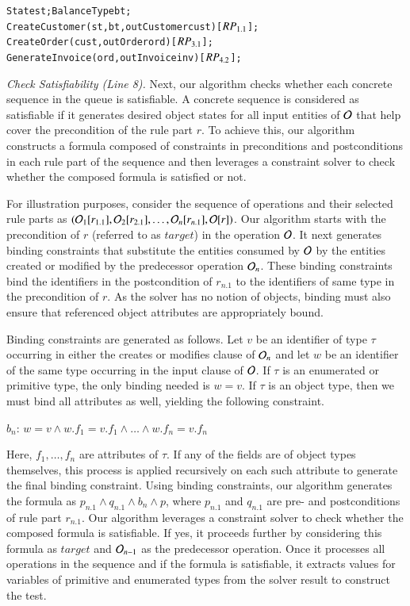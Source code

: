 \vspace*{-5pt}
{\small
\begin{alltt}
  State st; BalanceType bt;
  CreateCustomer(st, bt, out Customer cust) [\(RP\sb{1.1}\)];
  CreateOrder(cust, out Order ord) [\(RP\sb{3.1}\)];	
  GenerateInvoice(ord, out Invoice inv) [\(RP\sb{4.2}\)];  
\end{alltt}
}
\vspace*{-5pt}

\textit{Check Satisfiability (Line 8).} Next, our algorithm checks whether 
each concrete sequence in the queue is satisfiable. A concrete sequence 
is considered as satisfiable if it generates desired
object states for all input entities of ${\cal O}$ that help cover the precondition of the rule
part $r$. To achieve this, our algorithm constructs a formula composed
of constraints in preconditions and postconditions in each rule part of the sequence
and then leverages a constraint solver to check whether the composed
formula is satisfied or not.

For illustration purposes, consider the sequence of operations and their selected
rule parts as $({\cal O}_1 [r_{1.1}], {\cal O}_2 [r_{2.1}], \ldots, {\cal O}_n [r_{n.1}], {\cal O} [r])$.
Our algorithm starts with the precondition of $r$ (referred to as $target$) in the operation ${\cal O}$. 
It next generates binding constraints that substitute the entities
consumed by ${\cal O}$ by the entities created or
modified by the predecessor operation ${\cal O}_n$. These binding constraints bind 
the identifiers in the postcondition of $r_{n.1}$ to the identifiers of same type
in the precondition of $r$. As the solver has no
notion of objects, binding must also ensure that referenced object attributes
are appropriately bound.

Binding constraints are generated as follows. Let $v$ be an
identifier of type $\tau$ occurring in either the creates or modifies
clause of ${\cal O}_n$ and let $w$ be an identifier of the same type
occurring in the input clause of ${\cal O}$. If $\tau$ is an enumerated or primitive type,
the only binding needed is $w = v$. If $\tau$ is an object type, then
we must bind all attributes as well, yielding the following constraint.

$b_n$: $w = v \wedge w.f_1 = v.f_1 \wedge \ldots \wedge w.f_n = v.f_n$ 

Here, $f_1, \ldots , f_n$ are attributes of $\tau$. If any of the
fields are of object types themselves, this process is applied
recursively on each such attribute to generate the final binding
constraint. Using binding constraints, our algorithm generates the formula as $p_{n.1} \wedge q_{n.1}
\wedge b_n \wedge p$, where $p_{n.1}$ and $q_{n.1}$ are pre- and postconditions
of rule part $r_{n.1}$. Our algorithm leverages a 
constraint solver to check whether the composed formula is satisfiable.
If yes, it proceeds further by considering
this formula as $target$ and ${\cal O}_{n-1}$ as the predecessor operation.
Once it processes all operations in the sequence and if the formula is satisfiable,
it extracts values for variables of primitive and enumerated types
from the solver result to construct the test. 

